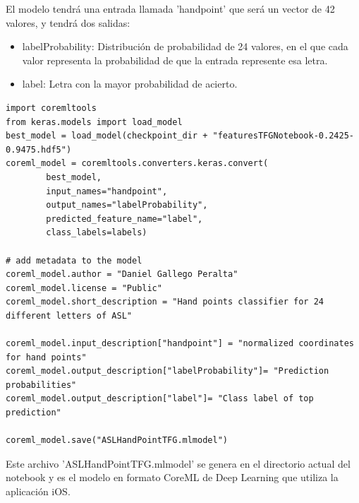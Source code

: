 \documentclass[../main.tex]{subfiles}
\begin{document}
El modelo tendrá una entrada llamada 'handpoint' que será un vector de 42 valores, y tendrá dos salidas:
\begin{itemize}
    \item labelProbability: Distribución de probabilidad de 24 valores, en el que cada valor representa la probabilidad de que la entrada represente esa letra.
    \item label: Letra con la mayor probabilidad de acierto.
\end{itemize}
 \newpage
 
\begin{lstlisting}[style=stylepython]
import coremltools
from keras.models import load_model
best_model = load_model(checkpoint_dir + "featuresTFGNotebook-0.2425-0.9475.hdf5")
coreml_model = coremltools.converters.keras.convert(
        best_model,
        input_names="handpoint",
        output_names="labelProbability",
        predicted_feature_name="label",
        class_labels=labels)

# add metadata to the model
coreml_model.author = "Daniel Gallego Peralta"
coreml_model.license = "Public"
coreml_model.short_description = "Hand points classifier for 24 different letters of ASL"

coreml_model.input_description["handpoint"] = "normalized coordinates for hand points"
coreml_model.output_description["labelProbability"]= "Prediction probabilities"
coreml_model.output_description["label"]= "Class label of top prediction"

coreml_model.save("ASLHandPointTFG.mlmodel")
\end{lstlisting}

Este archivo 'ASLHandPointTFG.mlmodel' se genera en el directorio actual del notebook y es el modelo en formato CoreML de Deep Learning que utiliza la aplicación iOS.
\end{document}
